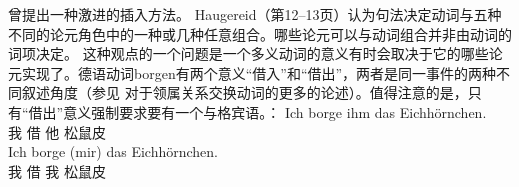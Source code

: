 \begin{exe}
\begin{xlist}[iv.]
\begin{exe}
\begin{xlist}[iv.]
\citet{Haugereid2009a}曾提出一种激进的插入方法。 Haugereid（第12--13页）认为句法决定动词与五种不同的论元角色中的一种或几种任意组合。哪些论元可以与动词组合并非由动词的词项决定。
这种观点的一个问题是一个多义动词的意义有时会取决于它的哪些论元实现了。德语动词borgen有两个意义“借入”和“借出”，两者是同一事件的两种不同叙述角度（参见 对于领属关系交换动词的更多的论述）。值得注意的是，只有“借出”意义强制要求要有一个与格宾语。\citep[]{MuellerGTBuch1}：
\eal
\ex 
\gll Ich borge ihm das Eichhörnchen.\\
     我   借  他  松鼠皮\\
\ex 
\gll Ich borge (mir) das Eichhörnchen.\\
     我 借 我  松鼠皮\\

\end{xlist}
\end{exe}
\end{xlist}
\end{exe}
